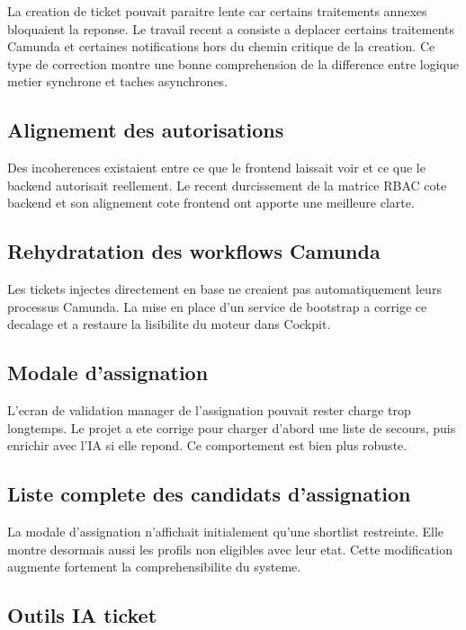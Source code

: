 La creation de ticket pouvait paraitre lente car certains traitements annexes bloquaient la reponse. Le travail recent a consiste a deplacer certains traitements Camunda et certaines notifications hors du chemin critique de la creation. Ce type de correction montre une bonne comprehension de la difference entre logique metier synchrone et taches asynchrones.

\subsection{Alignement des autorisations}

Des incoherences existaient entre ce que le frontend laissait voir et ce que le backend autorisait reellement. Le recent durcissement de la matrice RBAC cote backend et son alignement cote frontend ont apporte une meilleure clarte.

\subsection{Rehydratation des workflows Camunda}

Les tickets injectes directement en base ne creaient pas automatiquement leurs processus Camunda. La mise en place d'un service de bootstrap a corrige ce decalage et a restaure la lisibilite du moteur dans Cockpit.

\subsection{Modale d'assignation}

L'ecran de validation manager de l'assignation pouvait rester charge trop longtemps. Le projet a ete corrige pour charger d'abord une liste de secours, puis enrichir avec l'IA si elle repond. Ce comportement est bien plus robuste.

\subsection{Liste complete des candidats d'assignation}

La modale d'assignation n'affichait initialement qu'une shortlist restreinte. Elle montre desormais aussi les profils non eligibles avec leur etat. Cette modification augmente fortement la comprehensibilite du systeme.

\subsection{Outils IA ticket}

